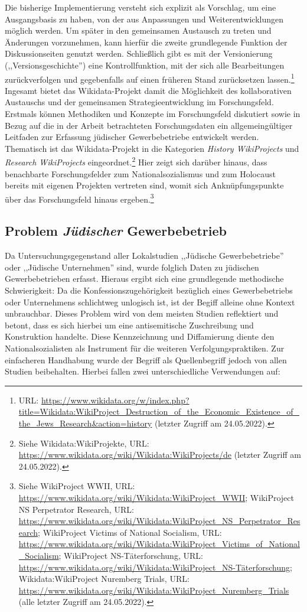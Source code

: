 Die bisherige Implementierung versteht sich explizit als Vorschlag, um eine Ausgangsbasis zu haben, von der aus Anpassungen und Weiterentwicklungen möglich werden. Um später in den gemeinsamen Austausch zu treten und Änderungen vorzunehmen, kann hierfür die zweite grundlegende Funktion der Diskussionseiten genutzt werden. Schließlich gibt es mit der Versionierung (,,Versionsgeschichte'') eine Kontrollfunktion, mit der sich alle Bearbeitungen zurückverfolgen und gegebenfalls auf einen früheren Stand zurücksetzen lassen.\footnote{URL: \url{https://www.wikidata.org/w/index.php?title=Wikidata:WikiProject_Destruction_of_the_Economic_Existence_of_the_Jews_Research&action=history} (letzter Zugriff am 24.05.2022).} Ingesamt bietet das Wikidata-Projekt damit die Möglichkeit des kollaborativen Austauschs und der gemeinsamen Strategieentwicklung im Forschungsfeld. Erstmals können Methodiken und Konzepte im Forschungsfeld diskutiert sowie in Bezug auf die in der Arbeit betrachteten Forschungsdaten ein allgemeingültiger Leitfaden zur Erfassung jüdischer Gewerbebetriebe entwickelt werden. Thematisch ist das Wikidata-Projekt in die Kategorien \textit{History WikiProjects} und \textit{Research WikiProjects} eingeordnet.\footnote{Siehe Wikidata:WikiProjekte, URL: \url{https://www.wikidata.org/wiki/Wikidata:WikiProjects/de} (letzter Zugriff am 24.05.2022).} Hier zeigt sich darüber hinaus, dass benachbarte Forschungsfelder zum Nationalsozialismus und zum Holocaust bereits mit eigenen Projekten vertreten sind, womit sich Anknüpfungspunkte über das Forschungsfeld hinaus ergeben.\footnote{Siehe WikiProject WWII, URL: \url{https://www.wikidata.org/wiki/Wikidata:WikiProject\_WWII}; WikiProject NS Perpetrator Research, URL: \url{https://www.wikidata.org/wiki/Wikidata:WikiProject\_NS\_Perpetrator\_Research}; WikiProject Victims of National Socialism, URL: \url{https://www.wikidata.org/wiki/Wikidata:WikiProject\_Victims\_of\_National\_Socialism}; WikiProject NS-Täterforschung, URL: \url{https://www.wikidata.org/wiki/Wikidata:WikiProject\_NS-Täterforschung}; Wikidata:WikiProject Nuremberg Trials, URL: \url{https://www.wikidata.org/wiki/Wikidata:WikiProject\_Nuremberg\_Trials} (alle letzter Zugriff am 24.05.2022).} 

\subsection{Problem \textit{Jüdischer} Gewerbebetrieb}

Da Untersuchungsgegenstand aller Lokalstudien ,,Jüdische Gewerbebetriebe'' oder ,,Jüdische Unternehmen'' sind, wurde folglich Daten zu jüdischen Gewerbebetrieben erfasst. Hieraus ergibt sich eine grundlegende methodische Schwierigkeit: Da die Konfessionszugehörigkeit bezüglich eines Gewerbebetriebs oder Unternehmens schlichtweg unlogisch ist, ist der Begiff alleine ohne Kontext unbrauchbar. Dieses Problem wird von dem meisten Studien reflektiert und betont, dass es sich hierbei um eine antisemitische Zuschreibung und Konstruktion handelte. Diese Kennzeichnung und Diffamierung diente den Nationalsozialisten als Instrument für die weiteren Verfolgungspraktiken. Zur einfacheren Handhabung wurde der Begriff als Quellenbegriff jedoch von allen Studien beibehalten. Hierbei fallen zwei unterschiedliche Verwendungen auf: 

